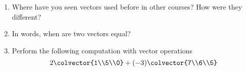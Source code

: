 \begin{enumerate}
%
\item  Where have you seen vectors used before in other courses?  How were they different?
%
\item In words, when are two vectors equal?
%
\item Perform the following computation with vector operations
%
\begin{equation*}
2\colvector{1\\5\\0} + (-3)\colvector{7\\6\\5}
\end{equation*}
%
\end{enumerate}

